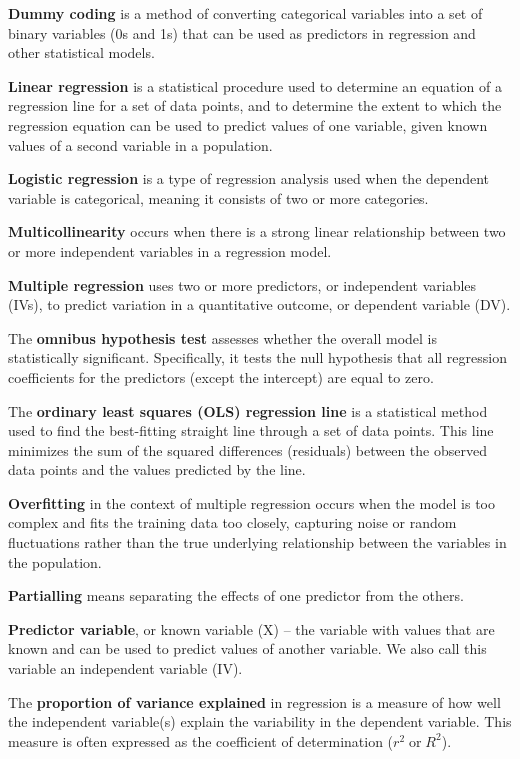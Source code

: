 \documentclass[
  letterpaper,
  DIV=11,
  numbers=noendperiod]{scrreprt}
\begin{document}
\textbf{Dummy coding} is a method of converting categorical variables
into a set of binary variables (0s and 1s) that can be used as
predictors in regression and other statistical models.

\textbf{Linear regression} is a statistical procedure used to determine
an equation of a regression line for a set of data points, and to
determine the extent to which the regression equation can be used to
predict values of one variable, given known values of a second variable
in a population.

\textbf{Logistic regression} is a type of regression analysis used when
the dependent variable is categorical, meaning it consists of two or
more categories.

\textbf{Multicollinearity} occurs when there is a strong linear
relationship between two or more independent variables in a regression
model.

\textbf{Multiple regression} uses two or more predictors, or independent
variables (IVs), to predict variation in a quantitative outcome, or
dependent variable (DV).

The \textbf{omnibus hypothesis test} assesses whether the overall model
is statistically significant. Specifically, it tests the null hypothesis
that all regression coefficients for the predictors (except the
intercept) are equal to zero.

The \textbf{ordinary least squares (OLS) regression line} is a
statistical method used to find the best-fitting straight line through a
set of data points. This line minimizes the sum of the squared
differences (residuals) between the observed data points and the values
predicted by the line.

\textbf{Overfitting} in the context of multiple regression occurs when
the model is too complex and fits the training data too closely,
capturing noise or random fluctuations rather than the true underlying
relationship between the variables in the population.

\textbf{Partialling} means separating the effects of one predictor from
the others.

\textbf{Predictor variable}, or known variable (X) -- the variable with
values that are known and can be used to predict values of another
variable. We also call this variable an independent variable (IV).\,\,

The \textbf{proportion of variance explained} in regression is a measure
of how well the independent variable(s) explain the variability in the
dependent variable. This measure is often expressed as the coefficient
of determination (\(r^2\) or \(R^2\)).
\end{document}
